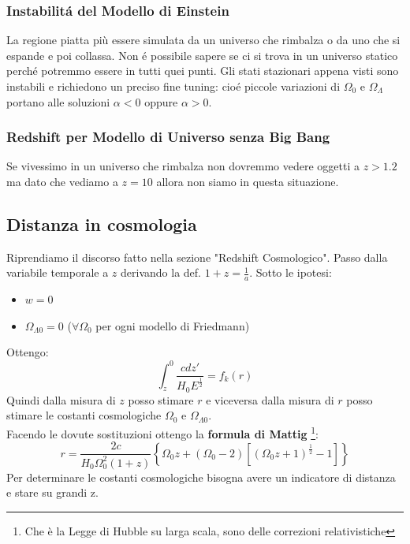 \documentclass[12pt, a4paper]{article}
\begin{document}
\subsubsection{Instabilit\'{a} del Modello di Einstein}
La regione piatta più essere simulata da un universo che rimbalza o da uno che si espande e poi collassa. Non \'{e} possibile sapere se ci si trova in un universo statico perch\'{e} potremmo essere in tutti quei punti. Gli stati stazionari appena visti sono instabili e richiedono un preciso fine tuning: cio\'{e} piccole variazioni di $\Omega_0$ e $\Omega_{\Lambda}$ portano alle soluzioni $\alpha<0$ oppure $\alpha>0$.
\subsubsection{Redshift per Modello di Universo senza Big Bang}
Se vivessimo in un universo che rimbalza non dovremmo vedere oggetti a $z>1.2$ ma dato che vediamo a $z=10$ allora non siamo in questa situazione.
\subsection{Distanza in cosmologia}
Riprendiamo il discorso fatto nella sezione "Redshift Cosmologico". Passo dalla variabile temporale a $z$ derivando la def. $1+z=\frac{1}{a}$. Sotto le ipotesi:
\begin{itemize}
    \item $w=0$
    \item $\Omega_{\Lambda0}=0$ ($\forall \Omega_0$ per ogni modello di Friedmann)
\end{itemize}
Ottengo:
\begin{equation}
    \int_{z}^{0}\frac{c dz'}{H_0 E^{\frac{1}{2}}}=f_k(r)
\end{equation}
Quindi dalla misura di $z$ posso stimare $r$ e viceversa dalla misura di $r$ posso stimare le costanti cosmologiche $\Omega_0$ e $\Omega_{\Lambda0}$.\\
Facendo le dovute sostituzioni ottengo la \textbf{formula di Mattig} \footnote{Che è la Legge di Hubble su larga scala, sono delle correzioni relativistiche}:
\begin{equation}
    r=\frac{2c}{H_0\Omega_0^2(1+z)}\left\{\Omega_0 z+(\Omega_0-2)[(\Omega_0 z+1)^{\frac{1}{2}}-1]\right\}
\end{equation}
Per determinare le costanti cosmologiche bisogna avere un indicatore di distanza e stare su grandi z.
\end{document}
